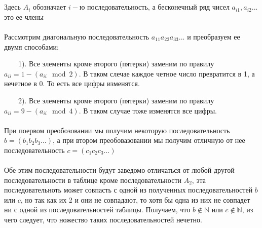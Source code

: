 \documentclass[a4paper, 12pt]{article}
\begin{document}
    \\
    \\ Здесь $A_i$ обозначает $i-$ю последовательность, а бесконечный ряд чисел $a_{i1}, a_{i2} ...$ это ее члены
    \\
    \\ Рассмотрим диагональную последовательность $a_{11} a_{22} a_{33} ... $ и преобразуем ее двумя способами:
    \par \ \ \ \ 1). Все элементы кроме второго (пятерки) заменим по правилу $a_{ii} = 1 - (a_{ii} \mod 2)$. В таком слечае каждое четное число превратится в 1, а нечетное в 0. То есть все цифры изменятся.
    \par \ \ \ \ 2). Все элементы кроме второго (пятерки) заменим по правилу $a_{ii} = 9 - (a_{ii} \mod 4)$. В таком случае тоже изменятся все цифры.
    \\
    \\ При поервом преобозовании мы получим некоторую последовательность $b = (b_1 b_2 b_3 \dots)$, а при втором преобовазовании мы получим отличную от нее последовательность $c = (c_1 c_2 c_3 \dots)$
    \\
    \\ Обе этим последовательности будут заведомо отличаться от любой другой последовательности в таблице кроме последовательности $A_2$, эта последовательноть может совпасть с одной из полученных последовательностей $b$ или $c$, но так как их 2 и они не совпадают, то хотя бы одна из них не совпадет ни с одной из последовательностей таблицы. Получаем, что $b \notin \mathbb{N}$ или $c \notin \mathbb{N}$, из чего следует, что ножество таких последовательностей нечетно.
    
\end{document}
